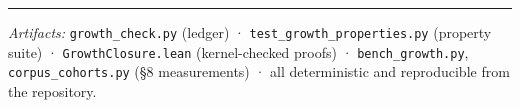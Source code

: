\documentclass[
  10pt,
]{article}
\begin{document}
\begin{center}\rule{0.5\linewidth}{0.5pt}\end{center}

\emph{Artifacts:} \texttt{growth\_check.py} (ledger) ·
\texttt{test\_growth\_properties.py} (property suite) ·
\texttt{GrowthClosure.lean} (kernel-checked proofs) ·
\texttt{bench\_growth.py}, \texttt{corpus\_cohorts.py} (§8 measurements)
· all deterministic and reproducible from the repository.
\end{document}

